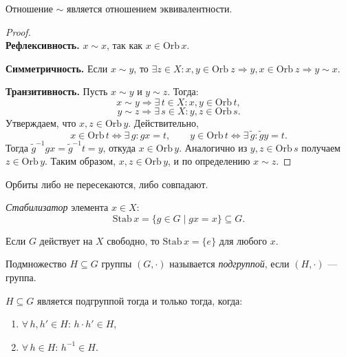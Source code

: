 \begin{stmt}
    Отношение $\sim$ является отношением эквивалентности.
    \begin{proof}
        
        \textbf{\\Рефлексивность.} $x \sim x$, так как $x \in \mathrm{Orb}\, x$.

        \textbf{Симметричность.} Если $x \sim y$, то $\exists z \in X: x, y \in \mathrm{Orb}\ z \Rightarrow 
        y, x \in \mathrm{Orb}\ z \Rightarrow y \sim x$.

        \textbf{Транзитивность.} Пусть $x \sim y$ и $y \sim z$. Тогда:
        \[
            x \sim y \Rightarrow \exists\, t \in X\colon x, y \in \mathrm{Orb}\, t,
        \]
        \[
            y \sim z \Rightarrow \exists\, s \in X\colon y, z \in \mathrm{Orb}\, s.
        \]
        Утверждаем, что $x, z \in \mathrm{Orb}\, y$. Действительно,
        \[
            x \in \mathrm{Orb}\, t \Leftrightarrow \exists\, g\colon gx = t,
            \qquad
            y \in \mathrm{Orb}\, t \Leftrightarrow \exists\, \tilde{g}\colon \tilde{g}y = t.
        \]
        Тогда $\tilde{g}^{-1} g x = \tilde{g}^{-1} t = y$, откуда $x \in \mathrm{Orb}\, y$.
        Аналогично из $y, z \in \mathrm{Orb}\, s$ получаем $z \in \mathrm{Orb}\, y$.
        Таким образом, $x, z \in \mathrm{Orb}\, y$, и по определению $x \sim z$.
    \end{proof}
\end{stmt}

\begin{cor}
    Орбиты либо не пересекаются, либо совпадают.
\end{cor}



\begin{definition}
    \emph{Стабилизатор} элемента $x \in X$:
    \[
        \mathrm{Stab}\, x = \{g \in G \mid gx = x\} \subseteq G.
    \]
\end{definition}

\begin{example}
    Если $G$ действует на $X$ свободно, то $\mathrm{Stab}\, x = \{e\}$ для любого $x$.
\end{example}

\begin{definition}
    Подмножество $H \subseteq G$ группы $(G, \cdot)$ называется \emph{подгруппой}, если $(H, \cdot)$ --- группа.
\end{definition}

\begin{stmt}
    $H \subseteq G$ является подгруппой тогда и только тогда, когда:
    \begin{enumerate}
        \item $\forall\, h, h' \in H$: $h \cdot h' \in H$,
        \item $\forall\, h \in H$: $h^{-1} \in H$.
    \end{enumerate}
\end{stmt}

